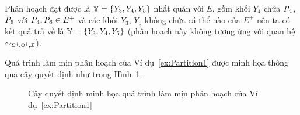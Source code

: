 \begin{Example}
Phân hoạch đạt được là $\mathbb{Y} = \{Y_3, Y_4, Y_5\}$ nhất quán với $E$, gồm khối $Y_4$ chứa $\mathit{P}_4$, $\mathit{P}_6$ với $\mathit{P}_4, \mathit{P}_6 \in E^+$ và các khối $Y_3$, $Y_5$ không chứa cá thể nào của $E^+$ nên ta có kết quả trả về là \mbox{$\mathbb{Y} = \{Y_3, Y_4, Y_5\}$}
(phân hoạch này không tương ứng với quan hệ $\sim_{\Sigma^\dag,\Phi^\dag,\mathcal{I}}$).\myend
\end{Example}

Quá trình làm mịn phân hoạch của Ví dụ~\ref{ex:Partition1} được minh họa thông qua cây quyết định như trong Hình~\ref{fig:DecisionTree1}.

\begin{figure}[h!]
\caption{Cây quyết định minh họa quá trình làm mịn phân hoạch của Ví dụ~\ref{ex:Partition1}\label{fig:DecisionTree1}}
\end{figure}

